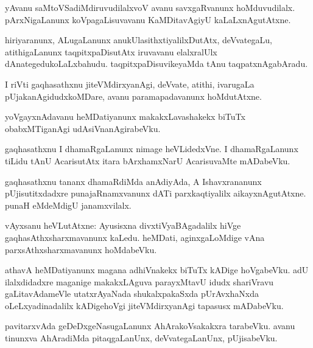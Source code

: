 \documentclass{article}
\begin{document}
\begin{mn}
yAvanu saMtoVSadiMdiruvudilalxvoV avanu savxgaRvanunx hoMduvudilalx. pArxNigaLanunx 
koVpagaLisuvavanu KaMDitavAgiyU kaLaLxnAgutAtxne.
\end{mn}

\begin{mn}
hiriyaranunx, ALugaLanunx anukUlasithxtiyalilxDutAtx, deVvategaLu, atithigaLanunx taqpitxpaDisutAtx
iruvavanu elalxralUlx dAnategedukoLaLxbahudu. taqpitxpaDisuvikeyaMda tAnu taqpatxnAgabAradu.
\end{mn}

\begin{mn}
I riVti gaqhasathxnu jiteVMdirxyanAgi, deVvate, atithi, ivarugaLa pUjakanAgidudxkoMDare, avanu 
paramapadavanunx hoMdutAtxne.
\end{mn}

\begin{mn}
yoVgayxnAdavanu heMDatiyanunx makakxLavashakekx biTuTx obabxMTiganAgi udAsiVnanAgirabeVku.
\end{mn}

\begin{mn}
gaqhasathxnu I dhamaRgaLanunx nimage heVLidedxVne. I dhamaRgaLanunx tiLidu tAnU AcarisutAtx itara 
bArxhamxNarU AcarisuvaMte mADabeVku.
\end{mn}

\begin{mn}
gaqhasathxnu tananx dhamaRdiMda anAdiyAda, A Ishavxrananunx  pUjisutitxdadxre punajaRnamxvanunx dATi
parxkaqtiyalilx aikayxnAgutAtxne. punaH eMdeMdigU janamxvilalx.
\end{mn}


\begin{mn}
vAyxsanu heVLutAtxne: Ayusisxna divxtiVyaBAgadalilx hiVge gaqhasAthxsharxmavanunx kaLedu. heMDati,
aginxgaLoMdige vAna parxsAthxsharxmavanunx hoMdabeVku.
\end{mn}

\begin{mn}
athavA heMDatiyanunx magana adhiVnakekx biTuTx kADige hoVgabeVku. adU ilalxdidadxre maganige 
makakxLAguva parayxMtavU idudx shariVravu gaLitavAdameVle utatxrAyaNada shukalxpakaSxda pUrAvxhaNxda 
oLeLxyadinadalilx kADigehoVgi jiteVMdirxyanAgi tapasusx mADabeVku.
\end{mn}

\begin{mn}
pavitarxvAda geDeDxgeNasugaLanunx AhArakoVsakakxra tarabeVku. avanu tinunxva AhAradiMda 
pitaqgaLanUnx, deVvategaLanUnx, pUjisabeVku.
\end{mn}
\end{document}
